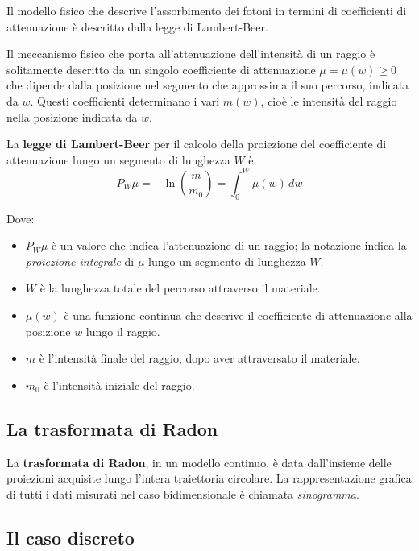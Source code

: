 \documentclass[12pt,a4paper]{report}
\begin{document}
Il modello fisico che descrive l'assorbimento dei fotoni in termini di coefficienti di attenuazione è descritto dalla legge di
Lambert-Beer.

Il meccanismo fisico che porta all'attenuazione dell'intensità di un raggio è solitamente descritto da un singolo coefficiente di
attenuazione \(\mu = \mu(w) \ge 0\) che dipende dalla posizione nel segmento che approssima il suo percorso, indicata da \(w\).
Questi coefficienti determinano i vari \(m(w)\), cioè le intensità del raggio nella posizione indicata da \(w\).

La \textbf{legge di Lambert-Beer} per il calcolo della proiezione del coefficiente di attenuazione lungo un segmento di lunghezza
\(W\) è:
\begin{equation} \label{eq:law_lambert-beer}
  P_W\mu = - \ln{(\frac{m}{m_0})} = \int_0^W \mu(w) \, dw
\end{equation}

Dove:
\begin{itemize}
  \item \(P_W\mu\) è un valore che indica l'attenuazione di un raggio; la notazione indica la \textit{proiezione integrale} di
        \(\mu\) lungo un segmento di lunghezza \(W\).
  \item \(W\) è la lunghezza totale del percorso attraverso il materiale.
  \item \(\mu(w)\) è una funzione continua che descrive il coefficiente di attenuazione alla posizione \(w\) lungo il raggio.
  \item \(m\) è l'intensità finale del raggio, dopo aver attraversato il materiale.
  \item \(m_0\) è l'intensità iniziale del raggio.
\end{itemize}

\subsection{La trasformata di Radon}

La \textbf{trasformata di Radon}, in un modello continuo, è data dall'insieme delle proiezioni acquisite lungo l'intera
traiettoria circolare.
La rappresentazione grafica di tutti i dati misurati nel caso bidimensionale è chiamata \textit{sinogramma}.

\subsection{Il caso discreto}
\end{document}
